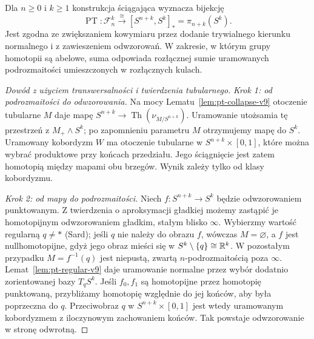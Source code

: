\begin{twierdzenie}
\label{thm:pt-framed-v9}
Dla $n\ge0$ i $k\ge1$ konstrukcja ściągająca
wyznacza bijekcję
\[
\operatorname{PT}:\mathcal F_n^k\xrightarrow{\cong}
[S^{n+k},S^k]_*=\pi_{n+k}(S^k).
\]
Jest zgodna ze zwiększaniem kowymiaru przez dodanie
trywialnego kierunku normalnego i z zawieszeniem
odwzorowań. W zakresie, w którym grupy homotopii
są abelowe, suma odpowiada rozłącznej sumie
uramowanych podrozmaitości umieszczonych w rozłącznych
kulach.
\end{twierdzenie}
\begin{proof}[Dowód z użyciem transwersalności i twierdzenia tubularnego]
\emph{Krok 1: od podrozmaitości do odwzorowania.}
Na mocy Lematu~\ref{lem:pt-collapse-v9} otoczenie tubularne
$M$ daje mapę $S^{n+k}\to\operatorname{Th}(\nu_{M/S^{n+k}})$.
Uramowanie utożsamia tę przestrzeń z $M_+\wedge S^k$;
po zapomnieniu parametru $M$ otrzymujemy mapę do $S^k$.
Uramowany kobordyzm $W$ ma otoczenie tubularne w
$S^{n+k}\times[0,1]$, które można wybrać produktowe
przy końcach przedziału. Jego ściągnięcie jest zatem
homotopią między mapami obu brzegów.
Wynik zależy tylko od klasy kobordyzmu.

\emph{Krok 2: od mapy do podrozmaitości.}
Niech $f:S^{n+k}\to S^k$ będzie odwzorowaniem
punktowanym. Z twierdzenia o aproksymacji gładkiej
możemy zastąpić je homotopijnym odwzorowaniem gładkim,
stałym blisko $\infty$. Wybierzmy wartość regularną
$q\ne*$ (Sard); jeśli $q$ nie należy do obrazu $f$,
wówczas $M=\varnothing$, a $f$ jest nullhomotopijne, gdyż
jego obraz mieści się w $S^k\setminus\{q\}\cong\mathbb{R}^k$.
W pozostałym przypadku $M=f^{-1}(q)$ jest niepustą, zwartą
$n$-podrozmaitością poza $\infty$.
Lemat~\ref{lem:pt-regular-v9} daje uramowanie normalne
przez wybór dodatnio zorientowanej bazy $T_qS^k$.
Jeśli $f_0,f_1$ są homotopijne przez homotopię punktowaną,
przybliżamy homotopię względnie do jej końców,
aby była poprzeczna do $q$. Przeciwobraz $q$
w $S^{n+k}\times[0,1]$ jest wtedy uramowanym
kobordyzmem z iloczynowym zachowaniem końców.
Tak powstaje odwzorowanie w stronę odwrotną.


\end{proof}

